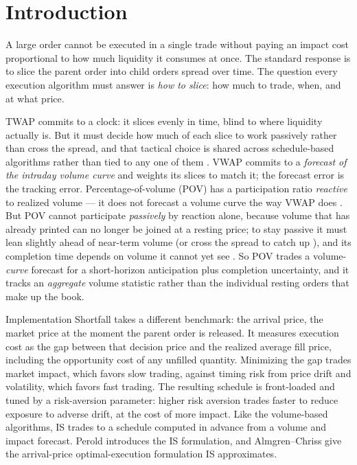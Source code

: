 \documentclass[11pt]{article}
\begin{document}
\section{Introduction}

A large order cannot be executed in a single trade without paying an impact
cost proportional to how much liquidity it consumes at once. The standard
response is to slice the parent order into child orders spread over time. The
question every execution algorithm must answer is \emph{how to slice}: 
how much to trade, when, and at what price.

TWAP commits to
a clock: it slices evenly in time, blind to where liquidity actually is. 
But it must decide how much of each slice to work passively rather 
than cross the spread, and that tactical choice is shared across 
schedule-based algorithms rather than tied to any one of them \cite{scheduletactics2014,limitmarkettactics2014}.
VWAP
commits to a \emph{forecast of the intraday volume curve} and weights its
slices to match it; the forecast error is the tracking error.
Percentage-of-volume (POV) has a participation ratio \emph{reactive} to
realized volume ---
it does not forecast a volume curve the way VWAP does
\cite{gueantpov2012,kissell}.
But POV cannot participate \emph{passively} by reaction alone,
because volume that has already printed can no longer be joined at a resting
price; to stay passive it must lean slightly ahead of near-term volume (or
cross the spread to catch up \cite{cartea2015,contkukanov2015}), and its completion time depends on volume it
cannot yet see \cite{vaeshauser2022}. So POV trades a volume-\emph{curve} forecast for a
short-horizon anticipation plus completion uncertainty, and it tracks an
\emph{aggregate} volume statistic rather than the individual resting orders
that make up the book.

Implementation Shortfall takes a different benchmark: the arrival price, the
market price at the moment the parent order is released. It measures execution
cost as the gap between that decision price and the realized average fill price,
including the opportunity cost of any unfilled quantity. Minimizing the gap
trades market impact, which favors slow trading, against timing risk from price
drift and volatility, which favors fast trading. The resulting schedule is
front-loaded and tuned by a risk-aversion parameter: higher risk aversion trades
faster to reduce exposure to adverse drift, at the cost of more impact. Like the volume-based algorithms, 
IS trades to a schedule computed in advance from a volume and
impact forecast. Perold \cite{perold1988} introduces the IS formulation, and
Almgren--Chriss \cite{almgren2000} give the arrival-price optimal-execution
formulation IS approximates.
\end{document}
